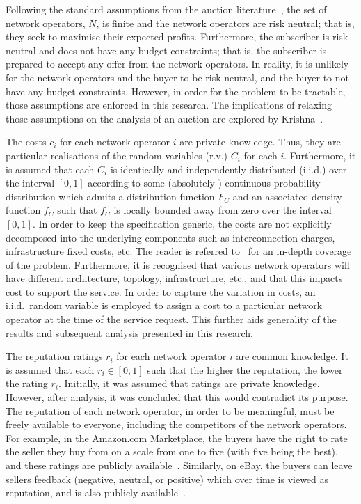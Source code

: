 Following the standard assumptions from the auction literature~\cite{Krishna10}, the set of network operators, $N$, is finite and the network operators are risk neutral; that is, they seek to maximise their expected profits. Furthermore, the subscriber is risk neutral and does not have any budget constraints; that is, the subscriber is prepared to accept any offer from the network operators. In reality, it is unlikely for the network operators and the buyer to be risk neutral, and the buyer to not have any budget constraints. However, in order for the problem to be tractable, those assumptions are enforced in this research. The implications of relaxing those assumptions on the analysis of an auction are explored by Krishna~\cite{Krishna10}.

The costs $c_i$ for each network operator $i$ are private knowledge. Thus, they are particular realisations of the random variables (r.v.) $C_i$ for each $i$. Furthermore, it is assumed that each $C_i$ is identically and independently distributed (i.i.d.) over the interval $[0,1]$ according to some (absolutely-) continuous probability distribution which admits a distribution function $F_{C}$ and an associated density function $f_{C}$ such that $f_C$ is locally bounded away from zero over the interval $[0,1]$. In order to keep the specification generic, the costs are not explicitly decomposed into the underlying components such as interconnection charges, infrastructure fixed costs, etc. The reader is referred to~\cite{Njoroge2009,LeCadre2009,HauBrenner2009} for an in-depth coverage of the problem. Furthermore, it is recognised that various network operators will have different architecture, topology, infrastructure, etc., and that this impacts cost to support the service. In order to capture the variation in costs, an i.i.d.~random variable is employed to assign a cost to a particular network operator at the time of the service request. This further aids generality of the results and subsequent analysis presented in this research.

The reputation ratings $r_i$ for each network operator $i$ are common knowledge. It is assumed that each $r_i\in [0,1]$ such that the higher the reputation, the lower the rating $r_i$. Initially, it was assumed that ratings are private knowledge. However, after analysis, it was concluded that this would contradict its purpose. The reputation of each network operator, in order to be meaningful, must be freely available to everyone, including the competitors of the network operators. For example, in the Amazon.com Marketplace, the buyers have the right to rate the seller they buy from on a scale from one to five (with five being the best), and these ratings are publicly available~\cite{AMAZON}. Similarly, on eBay, the buyers can leave sellers feedback (negative, neutral, or positive) which over time is viewed as reputation, and is also publicly available~\cite{EBAY}.
	
